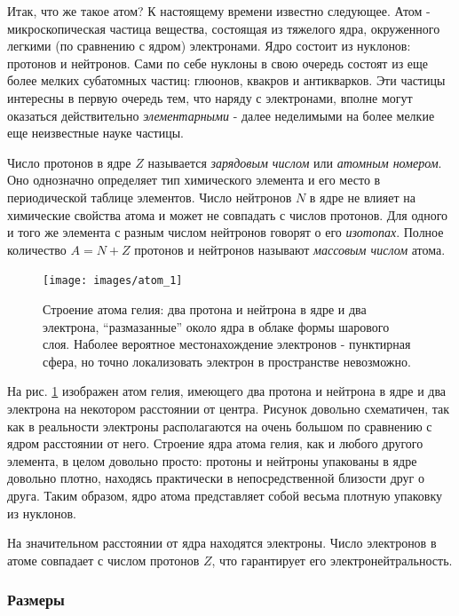 Итак, что же такое атом? К настоящему времени известно следующее.
Атом - микроскопическая частица вещества, состоящая из тяжелого ядра, окруженного легкими (по сравнению с ядром) электронами.
Ядро состоит из нуклонов: протонов и нейтронов.
Сами по себе нуклоны в свою очередь состоят из еще более мелких субатомных частиц: глюонов, квакров и антикварков.
Эти частицы интересны в первую очередь тем, что наряду с электронами, вполне могут оказаться действительно \textit{элементарными} - далее неделимыми на более мелкие еще неизвестные науке частицы.

Число протонов в ядре $Z$ называется \textit{зарядовым числом} или \textit{атомным номером}.
Оно однозначно определяет тип химического элемента и его место в периодической таблице элементов. 
Число нейтронов $N$ в ядре не влияет на химические свойства атома и может не совпадать с числов протонов.
Для одного и того же элемента с разным числом нейтронов говорят о его \textit{изотопах}.
Полное количество $A = N + Z$ протонов и нейтронов называют \textit{массовым числом} атома.

\begin{figure}[t!]
   \centering
   \texttt{[image: images/atom\_1]}
   \caption{Строение атома гелия: два протона и нейтрона в ядре и два электрона, ``размазанные'' около ядра в облаке формы шарового слоя. Наболее вероятное местонахождение электронов - пунктирная сфера, но точно локализовать электрон в пространстве невозможно.}
   \label{fig:atom_1}
\end{figure}

На рис. \ref{fig:atom_1} изображен атом гелия, имеющего два протона и нейтрона в ядре и два электрона на некотором расстоянии от центра.
Рисунок довольно схематичен, так как в реальности электроны располагаются на очень большом по сравнению с ядром расстоянии от него.
Строение ядра атома гелия, как и любого другого элемента, в целом довольно просто: протоны и нейтроны упакованы в ядре довольно плотно, находясь практически в непосредственной близости друг о друга.
Таким образом, ядро атома представляет собой весьма плотную упаковку из нуклонов.

На значительном расстоянии от ядра находятся электроны.
Число электронов в атоме совпадает с числом протонов $Z$, что гарантирует его электронейтральность.

\subsubsection*{Размеры}

